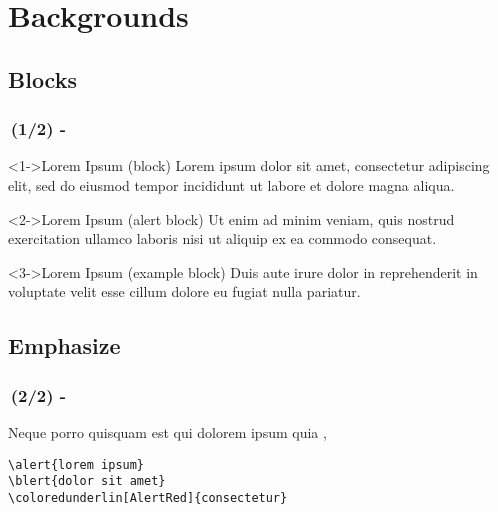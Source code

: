 \documentclass[./main]{subfiles}
\begin{document}
\setcounter{section}{0}
\section[Sec 1]{Backgrounds}




\subsection{Blocks}
\begin{frame}
  \frametitle{\secname\,(1/2) - \subsecname}
  {\small 
    \begin{block}<1->{Lorem Ipsum (block)}
      Lorem ipsum dolor sit amet, consectetur adipiscing elit, sed do eiusmod tempor incididunt ut labore et dolore magna aliqua. 
    \end{block}

    \begin{alertblock}<2->{Lorem Ipsum (alert block)}
      Ut enim ad minim veniam, quis nostrud exercitation ullamco laboris nisi ut aliquip ex ea commodo consequat. 
    \end{alertblock}

    \begin{exampleblock}<3->{Lorem Ipsum (example block)}
      Duis aute irure dolor in reprehenderit in voluptate velit esse cillum dolore eu fugiat nulla pariatur. 
    \end{exampleblock}
  }
\end{frame}




\subsection{Emphasize}
\begin{frame}[containsverbatim]
  \frametitle{\secname\,(2/2) - \subsecname}

  Neque porro quisquam est qui do\alert{lorem ipsum} quia ,  {\scriptsize \citep{tullius1914finibus}}
  
  \begin{verbatim}
\alert{lorem ipsum} 
\blert{dolor sit amet}
\coloredunderlin[AlertRed]{consectetur}
  \end{verbatim}


\end{frame}




\ifSubfilesClassLoaded{%
  \begin{frame}
    
  \end{frame}
}{}
\end{document}

